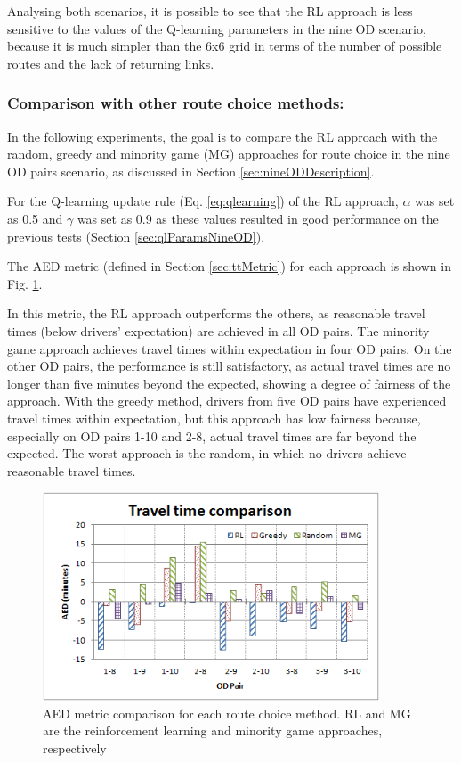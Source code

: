 \documentclass{RITA}
\begin{document}
Analysing both scenarios, it is possible to see that the RL approach is less sensitive to the values of the Q-learning parameters in the nine OD scenario, because it is much simpler than the 6x6 grid in terms of the number of possible routes and the lack of returning links. 

\subsubsection{Comparison with other route choice methods:}
\label{sec:comparison}
In the following experiments, the goal is to compare the RL approach with the random, greedy and minority game (MG) approaches for route choice in the nine OD pairs scenario, as discussed in Section \ref{sec:nineODDescription}.

For the Q-learning update rule (Eq. \ref{eq:qlearning}) of the RL approach, $\alpha$ was set as 0.5 and $\gamma $ was set as 0.9 as these values resulted in good performance on the previous tests (Section \ref{sec:qlParamsNineOD}).

The AED metric (defined in Section \ref{sec:ttMetric}) for each approach is shown in Fig. \ref{fig:travelTimeComparison}. 

In this metric, the RL approach outperforms the others, as reasonable travel times (below drivers' expectation) are achieved in all OD pairs. The minority game approach achieves travel times within expectation in four OD pairs. On the other OD pairs, the performance is still satisfactory, as actual travel times are no longer than five minutes beyond the expected, showing a degree of fairness of the approach. With the greedy method, drivers from five OD pairs have experienced travel times within expectation, but this approach has low fairness because, especially on OD pairs 1-10 and 2-8, actual travel times are far beyond the expected. The worst approach is the random, in which no drivers achieve reasonable travel times.

\begin{figure}[ht]
    \centerline{\includegraphics[width=10cm]{img/travelTimeComparison-hatched.png}}
    \caption{AED metric comparison for each route choice method. RL and MG are the reinforcement learning and minority game approaches, respectively}
    \label{fig:travelTimeComparison}
\end{figure}
\end{document}
